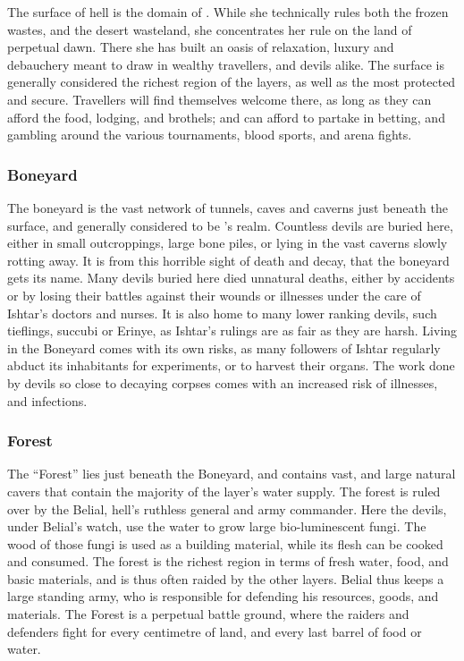 The surface of hell is the domain of . While she
technically rules both the frozen wastes, and the desert wasteland, she
concentrates her rule on the land of perpetual dawn. There she has built an
oasis of relaxation, luxury and debauchery meant to draw in wealthy
travellers, and devils alike. The surface is generally considered the richest
region of the layers, as well as the most protected and secure. Travellers
will find themselves welcome there, as long as they can afford the food,
lodging, and brothels; and can afford to partake in betting, and gambling
around the various tournaments, blood sports, and arena fights.

\subsubsection{Boneyard}
\label{sec:Boneyard}

The boneyard is the vast network of tunnels, caves and caverns just beneath
the surface, and generally considered to be 's
realm. Countless devils are buried here, either in small outcroppings, large
bone piles, or lying in the vast caverns slowly rotting away. It is from this
horrible sight of death and decay, that the boneyard gets its name. Many
devils buried here died unnatural deaths, either by accidents or by losing
their battles against their wounds or illnesses under the care of Ishtar's
doctors and nurses. It is also home to many lower ranking devils, such
tieflings, succubi or Erinye, as Ishtar's rulings are as fair as they are
harsh. Living in the Boneyard comes with its own risks, as many followers of
Ishtar regularly abduct its inhabitants for experiments, or to harvest their
organs. The work done by devils so close to decaying corpses comes with an
increased risk of illnesses, and infections.

\subsubsection{Forest}
\label{sec:Forest}

The ``Forest'' lies just beneath the Boneyard, and contains vast, and large
natural cavers that contain the majority of the layer's water supply. The
forest is ruled over by the Belial, hell's ruthless general and army
commander. Here the devils, under Belial's watch, use the water to grow large
bio-luminescent fungi. The wood of those fungi is used as a building material,
while its flesh can be cooked and consumed. The forest is the richest region
in terms of fresh water, food, and basic materials, and is thus often raided
by the other layers. Belial thus keeps a large standing army, who is responsible
for defending his resources, goods, and materials. The Forest is a perpetual
battle ground, where the raiders and defenders fight for every centimetre of
land, and every last barrel of food or water.

